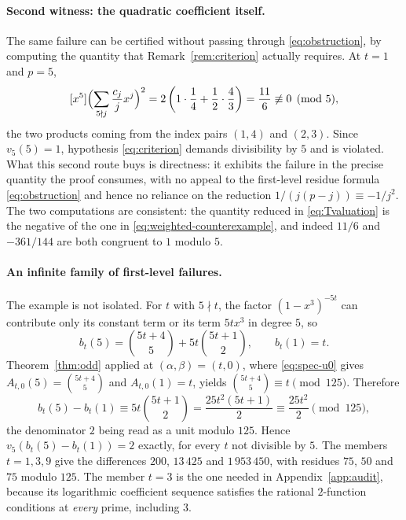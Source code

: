 \documentclass[11pt,a4paper]{article}
\numberwithin{equation}{section}
\theoremstyle{definition}
\theoremstyle{remark}
\begin{document}
\paragraph{Second witness: the quadratic coefficient itself.}
\label{par:direct}
The same failure can be certified without passing through
\eqref{eq:obstruction}, by computing the quantity that
Remark~\ref{rem:criterion} actually requires. At $t=1$ and $p=5$,
\begin{equation}\label{eq:direct-quadratic}
 [x^5]\Bigl(\sum_{5\nmid j}\frac{c_j}{j}x^j\Bigr)^2
 =2\left(1\cdot\frac14+\frac12\cdot\frac43\right)
 =\frac{11}{6}\not\equiv0\pmod5,
\end{equation}
the two products coming from the index pairs $(1,4)$ and $(2,3)$. Since
$v_5(5)=1$, hypothesis \eqref{eq:criterion} demands divisibility by $5$ and
is violated. What this second route buys is directness: it exhibits the
failure in the precise quantity the proof consumes, with no appeal to the
first-level residue formula \eqref{eq:obstruction} and hence no reliance on
the reduction $1/(j(p-j))\equiv-1/j^2$. The two computations are consistent:
the quantity reduced in \eqref{eq:Tvaluation} is the negative of the one in
\eqref{eq:weighted-counterexample}, and indeed $11/6$ and $-361/144$ are both
congruent to $1$ modulo $5$.

\paragraph{An infinite family of first-level failures.}
The example is not isolated. For $t$ with $5\nmid t$, the factor
$(1-x^3)^{-5t}$ can contribute only its constant term or its term
$5tx^3$ in degree $5$, so
\[
 b_t(5)=\binom{5t+4}{5}+5t\binom{5t+1}{2},\qquad b_t(1)=t.
\]
Theorem~\ref{thm:odd} applied at $(\alpha,\beta)=(t,0)$, where
\eqref{eq:spec-u0} gives $A_{t,0}(5)=\binom{5t+4}{5}$ and $A_{t,0}(1)=t$,
yields $\binom{5t+4}{5}\equiv t\pmod{125}$. Therefore
\begin{equation}\label{eq:period3-family}
 b_t(5)-b_t(1)\equiv5t\binom{5t+1}{2}=\frac{25t^2(5t+1)}{2}
 \equiv\frac{25t^2}{2}\pmod{125},
\end{equation}
the denominator $2$ being read as a unit modulo $125$. Hence
$v_5(b_t(5)-b_t(1))=2$ exactly, for every $t$ not divisible by $5$. The
members $t=1,3,9$ give the differences $200$, $13\,425$ and $1\,953\,450$,
with residues $75$, $50$ and $75$ modulo $125$. The member $t=3$ is the one
needed in Appendix~\ref{app:audit}, because its logarithmic coefficient
sequence satisfies the rational $2$-function conditions at \emph{every}
prime, including $3$.
\end{document}
